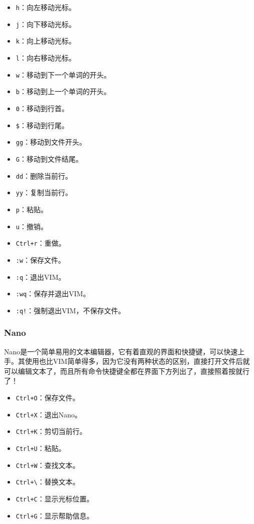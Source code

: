\documentclass[../main.tex]{subfiles}
\begin{document}
\begin{multicols}{2}
  \begin{itemize}
    \item \texttt{h}：向左移动光标。
    \item \texttt{j}：向下移动光标。
    \item \texttt{k}：向上移动光标。
    \item \texttt{l}：向右移动光标。
    \item \texttt{w}：移动到下一个单词的开头。
    \item \texttt{b}：移动到上一个单词的开头。
    \item \texttt{0}：移动到行首。
    \item \texttt{\$}：移动到行尾。
    \item \texttt{gg}：移动到文件开头。
    \item \texttt{G}：移动到文件结尾。
    \item \texttt{dd}：删除当前行。
    \item \texttt{yy}：复制当前行。
    \item \texttt{p}：粘贴。
    \item \texttt{u}：撤销。
    \item \texttt{Ctrl+r}：重做。
    \item \texttt{:w}：保存文件。
    \item \texttt{:q}：退出VIM。
    \item \texttt{:wq}：保存并退出VIM。
    \item \texttt{:q!}：强制退出VIM，不保存文件。
  \end{itemize}
\end{multicols}

\subsubsection{Nano}

Nano是一个简单易用的文本编辑器，它有着直观的界面和快捷键，可以快速上手。其使用也比VIM简单得多，因为它没有两种状态的区别，直接打开文件后就可以编辑文本了，而且所有命令快捷键全都在界面下方列出了，直接照着按就行了！

\begin{multicols}{2}
  \begin{itemize}
    \item \texttt{Ctrl+O}：保存文件。
    \item \texttt{Ctrl+X}：退出Nano。
    \item \texttt{Ctrl+K}：剪切当前行。
    \item \texttt{Ctrl+U}：粘贴。
    \item \texttt{Ctrl+W}：查找文本。
    \item \texttt{Ctrl+\textbackslash}：替换文本。
    \item \texttt{Ctrl+C}：显示光标位置。
    \item \texttt{Ctrl+G}：显示帮助信息。
  \end{itemize}
\end{multicols}
\end{document}

